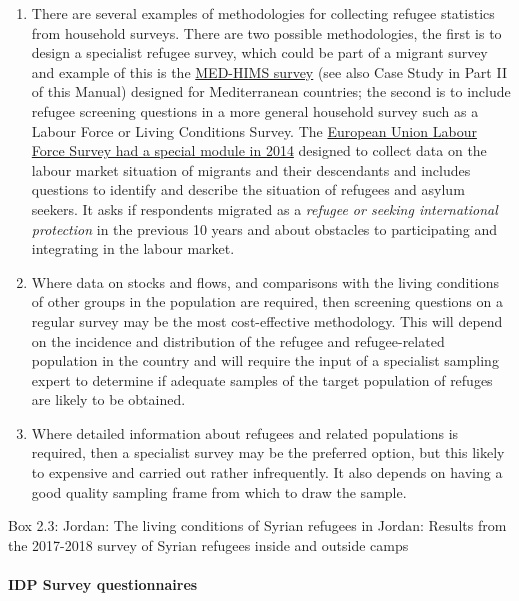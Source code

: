 \documentclass[
]{article}
\begin{document}
\begin{enumerate}
\def\labelenumi{\arabic{enumi}.}
\setcounter{enumi}{121}
\item
  There are several examples of methodologies for collecting refugee
  statistics from household surveys. There are two possible
  methodologies, the first is to design a specialist refugee survey,
  which could be part of a migrant survey and example of this is the
  \href{https://ec.europa.eu/eurostat/web/european-neighbourhood-policy/enp-south/med-hims}{MED-HIMS
  survey}
  (see also Case Study in Part II of this Manual) designed for
  Mediterranean countries; the second is to include refugee screening
  questions in a more general household survey such as a Labour Force
  or Living Conditions Survey. The \href{https://ec.europa.eu/eurostat/documents/1978984/6037334/Model-questionnaire-LFS-AHM-2014.pdf}{European Union Labour Force Survey
  had a special module in
  2014}
  designed to collect data on the labour market situation of migrants
  and their descendants and includes questions to identify and
  describe the situation of refugees and asylum seekers. It asks if
  respondents migrated as a \emph{refugee or seeking international
  protection} in the previous 10 years and about obstacles to
  participating and integrating in the labour market.
\item
  Where data on stocks and flows, and comparisons with the living
  conditions of other groups in the population are required, then
  screening questions on a regular survey may be the most
  cost-effective methodology. This will depend on the incidence and
  distribution of the refugee and refugee-related population in the
  country and will require the input of a specialist sampling expert
  to determine if adequate samples of the target population of refuges
  are likely to be obtained.
\item
  Where detailed information about refugees and related populations
  is required, then a specialist survey may be the preferred option,
  but this likely to expensive and carried out rather infrequently. It
  also depends on having a good quality sampling frame from which to
  draw the sample.
\end{enumerate}

Box 2.3: Jordan: The living conditions of Syrian refugees in Jordan:
Results from the 2017-2018 survey of Syrian refugees inside and outside
camps

\hypertarget{b.2.-idp-survey-questionnaires}{%
\paragraph{IDP Survey questionnaires}\label{b.2.-idp-survey-questionnaires}}
\end{document}
